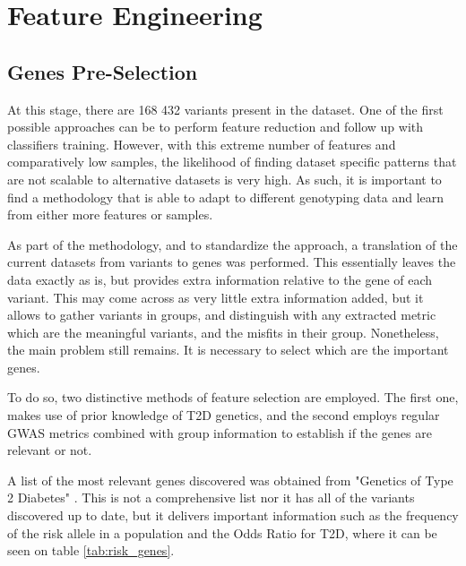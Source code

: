 
\chapter{Feature Engineering} \label{chapter:feature_extraction}

\section{Genes Pre-Selection}

At this stage, there are 168 432 variants present in the dataset. One of the first possible approaches can be to perform feature reduction and follow up with classifiers training. However, with this extreme number of features and comparatively low samples, the likelihood of finding dataset specific patterns that are not scalable to alternative datasets is very high. As such, it is important to find a methodology that is able to adapt to different genotyping data and learn from either more features or samples.

As part of the methodology, and to standardize the approach, a translation of the current datasets from variants to genes was performed. This essentially leaves the data exactly as is, but provides extra information relative to the gene of each variant. This may come across as very little extra information added, but it allows to gather variants in groups, and distinguish with any extracted metric which are the meaningful variants, and the misfits in their group. Nonetheless, the main problem still remains. It is necessary to select which are the important genes.

To do so, two distinctive methods of feature selection are employed. The first one, makes use of prior knowledge of \gls{T2D} genetics, and the second employs regular \gls{GWAS} metrics combined with group information to establish if the genes are relevant or not.

A list of the most relevant genes discovered was obtained from "Genetics of Type 2 Diabetes" \cite{ali2013genetics}. This is not a comprehensive list nor it has all of the variants discovered up to date, but it delivers important information such as the frequency of the risk allele in a population and the Odds Ratio for \gls{T2D}, where it can be seen on table \ref{tab:risk_genes}. 

